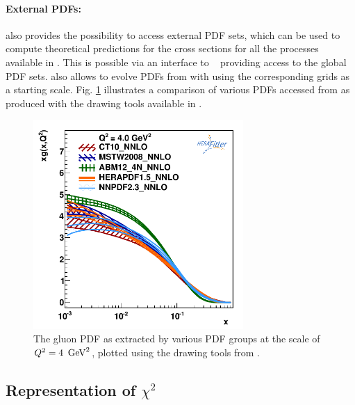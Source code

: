 \paragraph{External PDFs:} \rm 
 \fitter also provides the possibility to access external PDF sets, which can be used to compute 
theoretical predictions for the cross sections for all the processes available in \fitter. 
This is possible via an interface to \lhapdf~\cite{lhapdf,lhapdfweb} providing access to the 
global PDF sets.
\fitter also allows to evolve PDFs from \lhapdf with \qcdnum using the corresponding grids as a starting scale.
Fig. \ref{fig:pdfs} illustrates a comparison of various PDFs accessed from \lhapdf as produced with the drawing 
tools available in \fitter.
%
\begin{figure}[!ht]
   \centering
   \includegraphics[width=8cm]{pdfs.pdf}
   \caption{The gluon PDF as extracted by various PDF groups at the scale of $Q^2=4 \ \,\text{Ge\hspace{-.08em}V}^2$, plotted using the drawing tools from \fitter.} 
 \label{fig:pdfs}
\end{figure}
%
\subsection{Representation of \texorpdfstring{$\chi^2$}{χ²}}
\label{sec:chi2representation}

